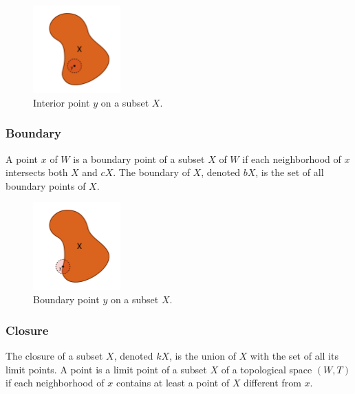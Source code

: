 \documentclass[a4paper,11pt,oneside]{article}
\begin{document}
\begin{figure}[ht]
	\begin{center}
		\includegraphics[width=0.3\textwidth]{section3/3.1/interior.png}
	\end{center}
	\caption{Interior point $y$ on a subset $X$.}
	\label{sect3:interior}
\end{figure}
    
\subsubsection{Boundary}
    
\begin{definition}
	A point $x$ of $W$ is a boundary point of a subset $X$ of $W$ if each neighborhood of $x$ intersects both $X$ and $cX$. The boundary of $X$, denoted $bX$, is the set of all boundary points of $X$. \cite{Requicha1978MathematicalFO}
\end{definition}
    
\begin{figure}[ht]
	\begin{center}
		\includegraphics[width=0.3\textwidth]{section3/3.1/boundary.png}
	\end{center}
	\caption{Boundary point $y$ on a subset $X$.}
	\label{sect3:boundary}
\end{figure}
    
\subsubsection{Closure}
    
\begin{definition}
	The closure of a subset $X$, denoted $kX$, is the union of $X$ with the set of all its limit points. A point is a limit point of a subset $X$ of a topological space $(W, T)$ if each neighborhood of $x$ contains at least a point of $X$ different from $x$. \cite{Requicha1978MathematicalFO}
\end{definition}
    
\end{document}
